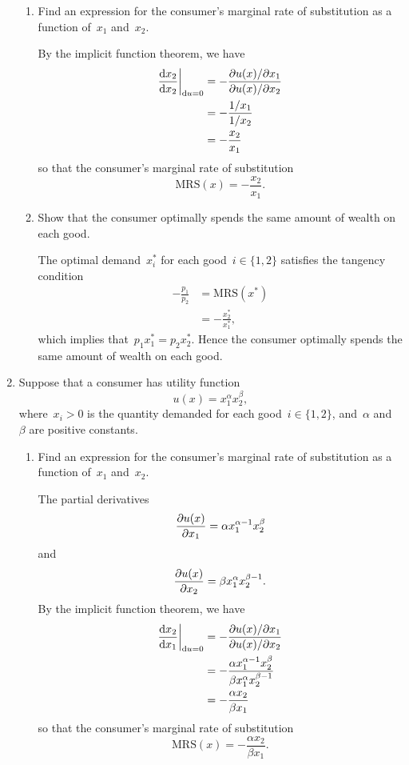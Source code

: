 \begin{enumerate}
\begin{enumerate}
		\item
		Find an expression for the consumer's marginal rate of substitution as a function of~$x_1$ and~$x_2$.
		\begin{solution}
			By the implicit function theorem, we have
			\begin{align}
				\frac{\mathrm{d} x_2}{\mathrm{d} x_2}\bigg\vert_{\mathrm{d} u=0}
				&= -\frac{\partial u(x)/\partial x_1}{\partial u(x)/\partial x_2}\\
				&= -\frac{1/x_1}{1/x_2}\\
				&= -\frac{x_2}{x_1}
			\end{align}
			so that the consumer's marginal rate of substitution
			\[ \text{MRS}(x)=-\frac{x_2}{x_1}. \]
		\end{solution}

		\item
		Show that the consumer optimally spends the same amount of wealth on each good.
		\begin{solution}
			The optimal demand~$x_i^*$ for each good~$i\in\{1,2\}$ satisfies the tangency condition
			\begin{align}
				-\frac{p_1}{p_2}
				&= \text{MRS}(x^*)\\
				&= -\frac{x_2^*}{x_1^*},
			\end{align}
			which implies that~$p_1x_1^*=p_2x_2^*$.
			Hence the consumer optimally spends the same amount of wealth on each good.
		\end{solution}

	\end{enumerate}

	\item
	Suppose that a consumer has utility function
	\[ u(x)=x_1^\alpha x_2^\beta, \]
	where~$x_i>0$ is the quantity demanded for each good~$i\in\{1,2\}$, and~$\alpha$ and~$\beta$ are positive constants.
	\begin{enumerate}
		
		\item
		Find an expression for the consumer's marginal rate of substitution as a function of~$x_1$ and~$x_2$.
		\begin{solution}
			The partial derivatives
			\[ \frac{\partial u(x)}{\partial x_1}=\alpha x_1^{\alpha-1}x_2^\beta \]
			and
			\[ \frac{\partial u(x)}{\partial x_2}=\beta x_1^\alpha x_2^{\beta-1}. \]
			By the implicit function theorem, we have
			\begin{align}
				\der{x_2}{x_1}\bigg\vert_{\d u=0}
				&= -\frac{\p u(x)/\p x_1}{\p u(x)/\p x_2}\\
				&= -\frac{\alpha x_1^{\alpha-1}x_2^\beta}%
					{\beta x_1^\alpha x_2^{\beta-1}}\\
				&= -\frac{\alpha x_2}{\beta x_1}
			\end{align}
			so that the consumer's marginal rate of substitution
			\[ \text{MRS}(x)=-\frac{\alpha x_2}{\beta x_1}. \]
		\end{solution}
		

\end{enumerate}
\end{enumerate}

